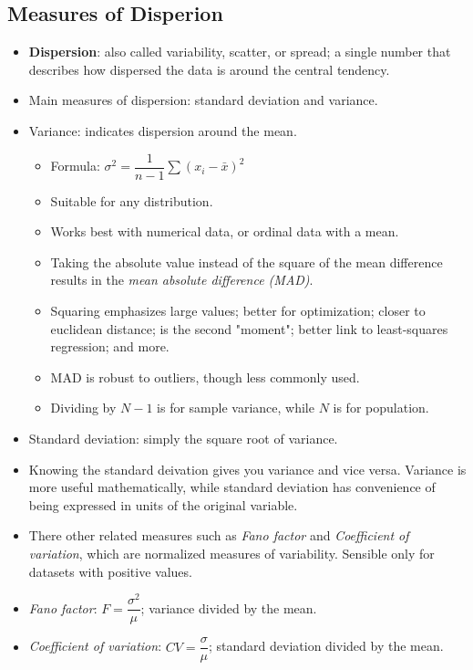 \documentclass[12pt,a4paper]{article}
\begin{document}
\subsection{Measures of Disperion}
\begin{itemize}
    \item \textbf{Dispersion}: also called variability, scatter, or spread; a single number that describes how dispersed the data is around the central tendency. 
    \item Main measures of dispersion: {\color{o-Sun}standard deviation} and {\color{o-Sun}variance}.
    \item {\color{o-Sun}Variance}: indicates dispersion around the mean.
        \begin{itemize}
            \item Formula: {\color{o-Sun}\(\sigma^2=\dfrac{1}{n-1}\sum(x_i-\bar{x})^2\)}
            \item Suitable for any distribution. 
            \item Works best with numerical data, or ordinal data with a mean.
            \item Taking the absolute value instead of the square of the mean difference results in the \textit{mean absolute difference (MAD)}.
            \item Squaring emphasizes large values; better for optimization; closer to euclidean distance; is the second "moment"; better link to least-squares regression; and more.
            \item MAD is robust to outliers, though less commonly used. 
            \item Dividing by \(N-1\) is for sample variance, while \(N\) is for population.
        \end{itemize}
    \item {\color{o-Sun}Standard deviation}: simply the square root of variance. 
    \item Knowing the standard deivation gives you variance and vice versa. Variance is more useful mathematically, while standard deviation has convenience of being expressed in units of the original variable.
    \item There other related measures such as \textit{Fano factor} and \textit{Coefficient of variation}, which are normalized measures of variability. Sensible only for datasets with positive values. 
    \item \textit{Fano factor}: \(F = \dfrac{\sigma^2}{\mu}\); variance divided by the mean.
    \item \textit{Coefficient of variation}: \(CV= \dfrac{\sigma}{\mu}\); standard deviation divided by the mean. 
\end{itemize}
\end{document}
